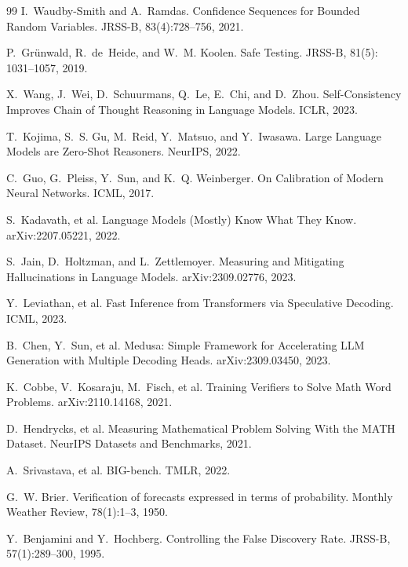 \documentclass[11pt]{article}
\begin{document}
\begin{thebibliography}{99}
I.~Waudby-Smith and A.~Ramdas.
\newblock Confidence Sequences for Bounded Random Variables.
\newblock JRSS-B, 83(4):728--756, 2021.

P.~Grünwald, R.~de~Heide, and W.~M. Koolen.
\newblock Safe Testing.
\newblock JRSS-B, 81(5): 1031--1057, 2019.

X.~Wang, J.~Wei, D.~Schuurmans, Q.~Le, E.~Chi, and D.~Zhou.
\newblock Self-Consistency Improves Chain of Thought Reasoning in Language Models.
\newblock ICLR, 2023.

T.~Kojima, S.~S. Gu, M.~Reid, Y.~Matsuo, and Y.~Iwasawa.
\newblock Large Language Models are Zero-Shot Reasoners.
\newblock NeurIPS, 2022.

C.~Guo, G.~Pleiss, Y.~Sun, and K.~Q. Weinberger.
\newblock On Calibration of Modern Neural Networks.
\newblock ICML, 2017.

S.~Kadavath, et al.
\newblock Language Models (Mostly) Know What They Know.
\newblock arXiv:2207.05221, 2022.

S.~Jain, D.~Holtzman, and L.~Zettlemoyer.
\newblock Measuring and Mitigating Hallucinations in Language Models.
\newblock arXiv:2309.02776, 2023.

Y.~Leviathan, et al.
\newblock Fast Inference from Transformers via Speculative Decoding.
\newblock ICML, 2023.

B.~Chen, Y.~Sun, et al.
\newblock Medusa: Simple Framework for Accelerating LLM Generation with Multiple Decoding Heads.
\newblock arXiv:2309.03450, 2023.

K.~Cobbe, V.~Kosaraju, M.~Fisch, et al.
\newblock Training Verifiers to Solve Math Word Problems.
\newblock arXiv:2110.14168, 2021.

D.~Hendrycks, et al.
\newblock Measuring Mathematical Problem Solving With the MATH Dataset.
\newblock NeurIPS Datasets and Benchmarks, 2021.

A.~Srivastava, et al.
\newblock BIG-bench.
\newblock TMLR, 2022.

G.~W. Brier.
\newblock Verification of forecasts expressed in terms of probability.
\newblock Monthly Weather Review, 78(1):1--3, 1950.

Y.~Benjamini and Y.~Hochberg.
\newblock Controlling the False Discovery Rate.
\newblock JRSS-B, 57(1):289--300, 1995.


\end{thebibliography}
\end{document}
